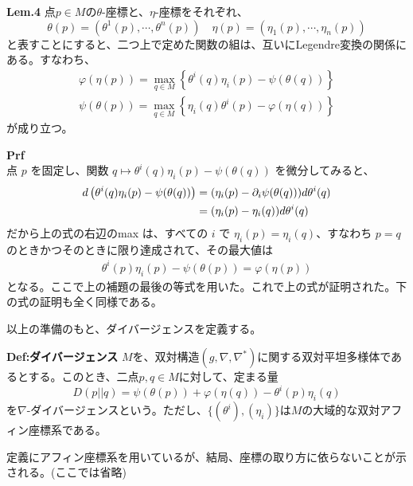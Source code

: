 \documentclass[a4paper,11pt]{jsarticle}
\numberwithin{equation}{section}
\begin{document}
    \begin{itembox}[l]{\textbf{Lem.4}}
        点$p \in M$の$\theta$-座標と、$\eta$-座標をそれぞれ、
        \begin{equation}
            \theta(p) = (\theta^1(p),\cdots,\theta^n(p)) \quad \eta(p) = (\eta_1(p),\cdots,\eta_n(p))
        \end{equation}
        と表すことにすると、二つ上で定めた関数の組は、互いにLegendre変換の関係にある。すなわち、
        \begin{align}
            \varphi(\eta(p)) = \underset{q \in M}{\max} \left\{ \theta^i(q)\eta_i(p) - \psi(\theta(q)) \right\}\\
            \psi(\theta(p)) = \underset{q \in M}{\max} \left\{ \eta_i(q)\theta^i(p) - \varphi(\eta(q)) \right\}
        \end{align}
        が成り立つ。
    \end{itembox}
    \textbf{Prf}\\
    点 \(p\) を固定し、関数 \(q \mapsto \theta^i(q) \eta_i(p) - \psi(\theta(q))\) を微分してみると、
    \begin{align}
    d \left( \theta^i(q) \eta_i(p) - \psi(\theta(q)) \right) &= (\eta_i(p) - \partial_i \psi(\theta(q))) d\theta^i(q) \notag \\
    &= (\eta_i(p) - \eta_i(q)) d\theta^i(q)
    \end{align}
    だから上の式の右辺のmax は、すべての \(i\) で \(\eta_i(p) = \eta_i(q)\)、すなわち \(p = q\) のときかつそのときに限り達成されて、その最大値は
    \begin{align}
    \theta^i(p) \eta_i(p) - \psi(\theta(p)) = \varphi(\eta(p))
    \end{align}
    となる。ここで上の補題の最後の等式を用いた。これで上の式が証明された。下の式の証明も全く同様である。 \hfill\qedsymbol
    
    
    以上の準備のもと、ダイバージェンスを定義する。
    \begin{itembox}[l]{\textbf{Def:ダイバージェンス}}
        $M$を、双対構造$(g,\nabla,\nabla^*)$に関する双対平坦多様体であるとする。このとき、二点$p,q \in M$に対して、定まる量
        \begin{equation}
            D(p||q) = \psi(\theta(p)) + \varphi(\eta(q)) - \theta^i(p)\eta_i(q)
        \end{equation}
        を$\nabla$-ダイバージェンスという。ただし、$\{(\theta ^i),(\eta_i)\}$は$M$の大域的な双対アフィン座標系である。
    \end{itembox}
    定義にアフィン座標系を用いているが、結局、座標の取り方に依らないことが示される。(ここでは省略)\\
    
\end{document}
